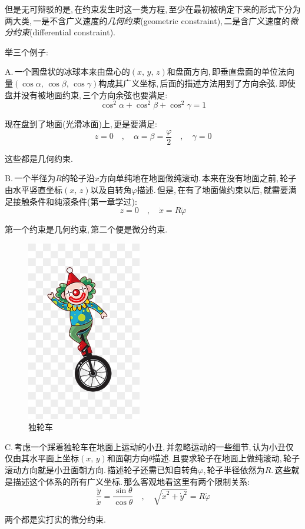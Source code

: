 但是无可辩驳的是,\,在约束发生时这一类方程,\,至少在最初被确定下来的形式下分为两大类,\,一是不含广义速度的\emph{几何约束}(geometric constraint),\,二是含广义速度的\emph{微分约束}(differential constraint).

举三个例子:

A.\,一个圆盘状的冰球本来由盘心的$(x,\,y,\,z)$和盘面方向,\,即垂直盘面的单位法向量$(\cos\alpha,\,\cos\beta,\,\cos\gamma)$构成其广义坐标,\,后面的描述方法用到了方向余弦.\,即使盘并没有被地面约束,\,三个方向余弦也要满足:
\[\cos^2\alpha+\cos^2\beta+\cos^2\gamma=1\]

现在盘到了地面(光滑冰面)上,\,更是要满足:
\[z=0\quad,\quad \alpha=\beta=\frac{\varphi}{2}\quad,\quad \gamma=0\]

这些都是几何约束.

B.\,一个半径为$R$的轮子沿$x$方向单纯地在地面做纯滚动.\,本来在没有地面之前,\,轮子由水平竖直坐标$(x,\,z)$以及自转角$\varphi$描述.\,但是,\,在有了地面做约束以后,\,就需要满足接触条件和纯滚条件(第一章学过):
\[z=0\quad ,\quad \dot{x}=R\dot{\varphi}\]

第一个约束是几何约束,\,第二个便是微分约束.

\begin{figure}
\centering
\includegraphics[width=5cm]{image/6-2-6.jpg}
\caption{独轮车}
\end{figure}
C.\,考虑一个踩着独轮车在地面上运动的小丑,\,并忽略运动的一些细节,\,认为小丑仅仅由其水平面上坐标$(x,\,y)$和面朝方向$\theta$描述.\,且要求轮子在地面上做纯滚动,\,轮子滚动方向就是小丑面朝方向.\,描述轮子还需已知自转角$\varphi$,\,轮子半径依然为$R$.\,这些就是描述这个体系的所有广义坐标.\,那么客观地看这里有两个限制关系:
\[\frac{\dot{y}}{\dot{x}}=\frac{\sin\theta}{\cos\theta}\quad,\quad \sqrt{\dot{x}^2+\dot{y}^2}=R\dot{\varphi}\]

两个都是实打实的微分约束.

